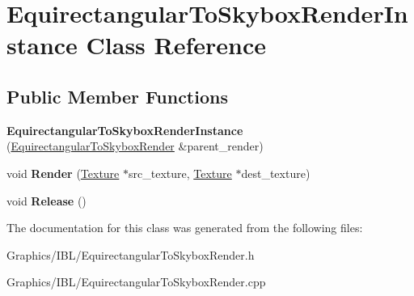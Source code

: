 \hypertarget{classEquirectangularToSkyboxRenderInstance}{}\section{Equirectangular\+To\+Skybox\+Render\+Instance Class Reference}
\label{classEquirectangularToSkyboxRenderInstance}
\subsection*{Public Member Functions}
\begin{DoxyCompactItemize}
\item 
\mbox{\label{classEquirectangularToSkyboxRenderInstance_a1b7069f1eec6b19e8788bd2867d7fe77}} 
{\bfseries Equirectangular\+To\+Skybox\+Render\+Instance} (\hyperlink{classEquirectangularToSkyboxRender}{Equirectangular\+To\+Skybox\+Render} \&parent\+\_\+render)
\item 
\mbox{\label{classEquirectangularToSkyboxRenderInstance_a1423de673fbd98b4e1a13b4190a88939}} 
void {\bfseries Render} (\hyperlink{classTexture}{Texture} $\ast$src\+\_\+texture, \hyperlink{classTexture}{Texture} $\ast$dest\+\_\+texture)
\item 
\mbox{\label{classEquirectangularToSkyboxRenderInstance_a9ed07baffc58ea8086a3bd8943ccf3c9}} 
void {\bfseries Release} ()
\end{DoxyCompactItemize}


The documentation for this class was generated from the following files\+:\begin{DoxyCompactItemize}
\item 
Graphics/\+I\+B\+L/Equirectangular\+To\+Skybox\+Render.\+h\item 
Graphics/\+I\+B\+L/Equirectangular\+To\+Skybox\+Render.\+cpp\end{DoxyCompactItemize}

